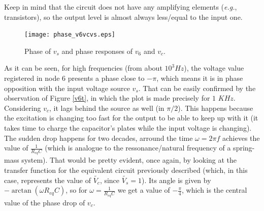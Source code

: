 \vspace{3mm}
\par Keep in mind that the circuit does not have any amplifying elements (\textit{e.g.}, transistors), so the output level is almost always less/equal to the input one. 

\newpage
 \begin{figure}[h]
     \centering
         \texttt{[image: phase\_v6vcvs.eps]}
         \caption{Phase of $v_{s}$ and phase responses of $v_{6}$ and $v_{c}$.}
     \label{phase_v6vcvs}
 \end{figure}
 \vspace{5mm}

 \par As it can be seen, for high frequencies (from about $10^3 Hz$), the voltage value registered in node 6 presents a phase close to $-\pi$, which means it is in phase opposition with the input voltage source $v_s$. That can be easily confirmed by the observation of Figure \ref{v6t}, in which the plot is made precisely for $1$ $KHz$. Considering $v_c$, it lags behind the source as well (in $\pi/2$). This happens because the excitation is changing too fast for the output to be able to keep up with it (it takes time to charge the capacitor's plates while the input voltage is changing). The sudden drop happens for two decades, arround the time $\omega=2\pi f$ achieves the value of $\frac{1}{R_{eq}C}$ (which is analogue to the ressonance/natural frequency of a spring-mass system). That would be pretty evident, once again, by looking at the transfer function for the equivalent circuit previously described (which, in this case, represents the value of $\widetilde{V_c}$, since $\widetilde{V_s}=1$). Its angle is given by $-\arctan(\omega R_{eq}C)$, so for $\omega =\frac{1}{R_{eq}C}$ we get a value of $-\frac{\pi}{4}$, which is the central value of the phase drop of $v_{c}$.


